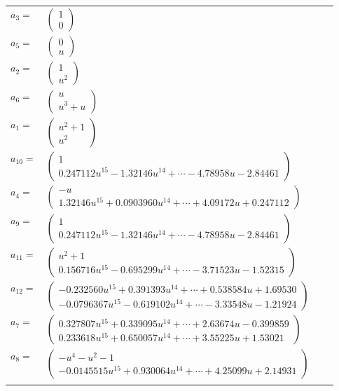 \documentclass[1p]{elsarticle_modified}
\theoremstyle{definition}
\begin{document}
\begin{tabular}{m{7pt} m{180pt} m{7pt} m{180pt} }
\flushright $a_{3}=$&$\begin{pmatrix}1\\0\end{pmatrix}$ \\
\flushright $a_{5}=$&$\begin{pmatrix}0\\u\end{pmatrix}$ \\
\flushright $a_{2}=$&$\begin{pmatrix}1\\u^2\end{pmatrix}$ \\
\flushright $a_{6}=$&$\begin{pmatrix}u\\u^3+u\end{pmatrix}$ \\
\flushright $a_{1}=$&$\begin{pmatrix}u^2+1\\u^2\end{pmatrix}$ \\
\flushright $a_{10}=$&$\begin{pmatrix}1\\0.247112 u^{15}-1.32146 u^{14}+\cdots-4.78958 u-2.84461\end{pmatrix}$ \\
\flushright $a_{4}=$&$\begin{pmatrix}- u\\1.32146 u^{15}+0.0903960 u^{14}+\cdots+4.09172 u+0.247112\end{pmatrix}$ \\
\flushright $a_{9}=$&$\begin{pmatrix}1\\0.247112 u^{15}-1.32146 u^{14}+\cdots-4.78958 u-2.84461\end{pmatrix}$ \\
\flushright $a_{11}=$&$\begin{pmatrix}u^2+1\\0.156716 u^{15}-0.695299 u^{14}+\cdots-3.71523 u-1.52315\end{pmatrix}$ \\
\flushright $a_{12}=$&$\begin{pmatrix}-0.232560 u^{15}+0.391393 u^{14}+\cdots+0.538584 u+1.69530\\-0.0796367 u^{15}-0.619102 u^{14}+\cdots-3.33548 u-1.21924\end{pmatrix}$ \\
\flushright $a_{7}=$&$\begin{pmatrix}0.327807 u^{15}+0.339095 u^{14}+\cdots+2.63674 u-0.399859\\0.233618 u^{15}+0.650057 u^{14}+\cdots+3.55225 u+1.53021\end{pmatrix}$ \\
\flushright $a_{8}=$&$\begin{pmatrix}- u^4- u^2-1\\-0.0145515 u^{15}+0.930064 u^{14}+\cdots+4.25099 u+2.14931\end{pmatrix}$\\&\end{tabular}
\end{document}
